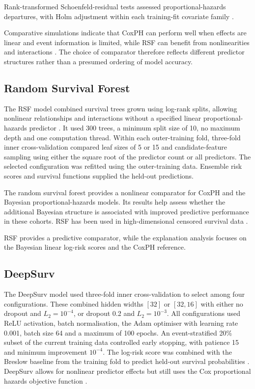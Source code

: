 Rank-transformed Schoenfeld-residual tests assessed proportional-hazards departures, with Holm adjustment within each training-fit covariate family \cite{schoenfeld1982,holm1979}.

Comparative simulations indicate that CoxPH can perform well when effects are linear and event information is limited, while RSF can benefit from nonlinearities and interactions \cite{ref37}. The choice of comparator therefore reflects different predictor structures rather than a presumed ordering of model accuracy.

\subsection{Random Survival Forest}\label{random-survival-forest}

The RSF model combined survival trees grown using log-rank splits, allowing nonlinear relationships and interactions without a specified linear proportional-hazards predictor \cite{ishwaran2008}. It used 300 trees, a minimum split size of 10, no maximum depth and one computation thread. Within each outer-training fold, three-fold inner cross-validation compared leaf sizes of 5 or 15 and candidate-feature sampling using either the square root of the predictor count or all predictors. The selected configuration was refitted using the outer-training data. Ensemble risk scores and survival functions supplied the held-out predictions.

The random survival forest provides a nonlinear comparator for CoxPH and the Bayesian proportional-hazards models. Its results help assess whether the additional Bayesian structure is associated with improved predictive performance in these cohorts. RSF has been used in high-dimensional censored survival data \cite{ref51}.

RSF provides a predictive comparator, while the explanation analysis focuses on the Bayesian linear log-risk scores and the CoxPH reference.

\subsection{DeepSurv}\label{deepsurv}

The DeepSurv model used three-fold inner cross-validation to select among four configurations. These combined hidden widths $[32]$ or $[32,16]$ with either no dropout and $L_2=10^{-4}$, or dropout 0.2 and $L_2=10^{-3}$. All configurations used ReLU activation, batch normalisation, the Adam optimiser with learning rate 0.001, batch size 64 and a maximum of 100 epochs. An event-stratified 20\% subset of the current training data controlled early stopping, with patience 15 and minimum improvement $10^{-4}$. The log-risk score was combined with the Breslow baseline from the training fold to predict held-out survival probabilities \cite{breslow1974}. DeepSurv allows for nonlinear predictor effects but still uses the Cox proportional hazards objective function \cite{ref4}.

